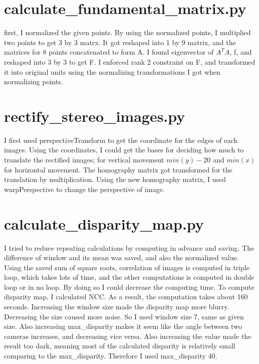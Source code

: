 \section*{calculate\_fundamental\_matrix.py}

first, I normalized the given points. By using the normalized points, I multiplied two points to get 3 by 3 matrx. It got reshaped into 1 by 9 matrix, and the matrices for 8 points concatenated to form A. I found eigenvector of $A^T A$, f, and reshaped into 3 by 3 to get F. I enforced rank 2 constraint on F, and transformed it into original units using the normalizing transformations I got when normalizing points. 

\section*{rectify\_stereo\_images.py}

I first used perspectiveTransform to get the coordinate for the edges of each images. Using the coordinates, I could get the bases for deciding how much to translate the rectified images; for vertical movement $min(y) - 20$ and $min(x)$ for horizontal movement. The homography matrix got transformed for the translation by multiplication. Using the new homography matrix, I used warpPerspective to change the perspective of image. 


\section*{calculate\_disparity\_map.py}

I tried to reduce repeating calculations by computing in advance and saving. The difference of window and its mean was saved, and also the normalized value. Using the saved sum of square roots, correlation of images is computed in triple loop, which takes lots of time, and the other computations is computed in double loop or in no loop. By doing so I could decrease the computing time. 
To compute disparity map, I calculated NCC. 
As a result, the computation takes about 160 seconds. 
Increasing the window size made the disparity map more blurry. Decreasing the size caused more noise. So I used window size 7, same as given size. Also increasing max\_disparity makes it seem like the angle between two cameras increases, and decreasing vice versa. Also increasing the value made the result too dark, meaning most of the calculated disparity is relatively small comparing to the max\_disparity. Therefore I used max\_disparity 40.

